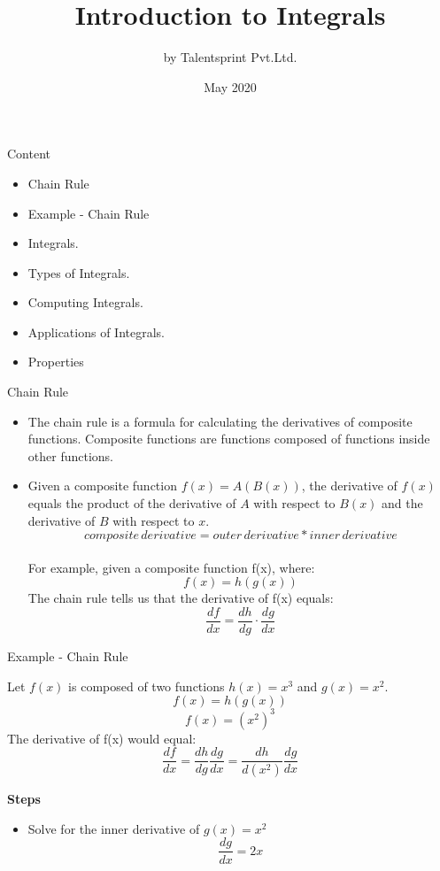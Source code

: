 \documentclass{beamer}
\title{Introduction to Integrals}
\author{by Talentsprint Pvt.Ltd.}
\date{May 2020}
\begin{document}
\maketitle
\begin{frame}{Content}
	\begin{itemize}
		\item Chain Rule
		\item Example - Chain Rule 
		\item Integrals.
		\item Types of Integrals.
		\item Computing Integrals.
		\item Applications of Integrals.
		\item Properties
	\end{itemize}
\end{frame}
\begin{frame}{Chain Rule}
\begin{itemize}
    \item The chain rule is a formula for calculating the derivatives of composite functions. Composite functions are functions composed of functions inside other functions.
\vspace{10pt}
    \item Given a composite function $f(x) = A(B(x))$, the derivative of $f(x)$ equals the product of the derivative of $A$ with respect to $B(x)$ and the derivative of $B$ with respect to $x$.
	$$composite \hspace{2pt}derivative = outer \hspace{2pt}derivative * inner \hspace{2pt}derivative$$ \\
For example, given a composite function f(x), where:
	$$f(x) = h(g(x))$$
The chain rule tells us that the derivative of f(x) equals:
\begin{equation*}
	\frac{df}{dx} = \frac{dh}{dg} \cdot \frac{dg}{dx}
\end{equation*}
\end{itemize}
\end{frame}
\begin{frame}{Example - Chain Rule}
\begin{flushleft} 
	Let $f(x)$ is composed of two functions $h(x) = x^3$ and $g(x) = x^2$.
		$$f(x) = h(g(x))$$
		$$f(x) = (x^2)^3$$
	The derivative of f(x) would equal:
	\begin{equation*}
		\frac{df}{dx}  =  \frac{dh}{dg} \frac{dg}{dx}  =  \frac{dh}{d(x^2)} \frac{dg}{dx}
	\end{equation*}

	\textbf{Steps}\\
	\begin{itemize}
		\item Solve for the inner derivative of $g(x) = x^2$
		$$\frac{dg}{dx} = 2x$$
	\end{itemize}
\end{flushleft}
\end{frame}
\end{document}
